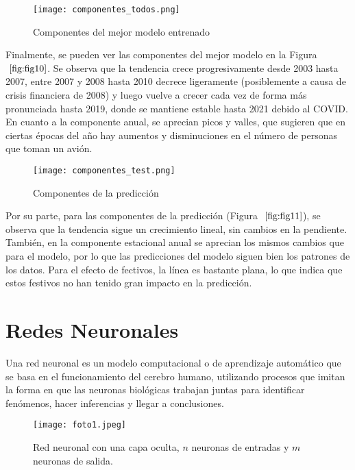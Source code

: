 \documentclass[12pt,twoside]{article}
\begin{document}
\begin{figure}[h]
    \centering
    \texttt{[image: componentes\_todos.png]}
    \caption{Componentes del mejor modelo entrenado }
    \label{fig:fig10}
\end{figure}

Finalmente, se pueden ver las componentes del mejor modelo en la Figura $~\ref{fig:fig10}$. Se observa que la tendencia crece progresivamente desde 2003 hasta 2007, entre 2007 y 2008 hasta 2010 decrece ligeramente (posiblemente a causa de crisis financiera de 2008) y luego vuelve a crecer cada vez de forma más pronunciada hasta 2019, donde se mantiene estable hasta 2021 debido al COVID. En cuanto a la componente anual, se aprecian picos y valles, que sugieren que en ciertas épocas del año hay aumentos y disminuciones en el número de personas que toman un avión.

\begin{figure}[h]
    \centering
    \texttt{[image: componentes\_test.png]}
    \caption{Componentes de la predicción} 
    \label{fig:fig11}
\end{figure}


Por su parte, para las componentes de la predicción (Figura $~\ref{fig:fig11}$), se observa que la tendencia sigue un crecimiento lineal, sin cambios en la pendiente. También, en la componente estacional anual se aprecian los mismos cambios que para el modelo, por lo que las predicciones del modelo siguen bien los patrones de los datos. Para el efecto de fectivos, la línea es bastante plana, lo que indica que estos festivos no han tenido gran impacto en la predicción.










\newpage


\section{Redes Neuronales}\label{sec:10}

Una red neuronal \cite{redes1} es un modelo computacional o de aprendizaje automático que se basa en el funcionamiento del cerebro humano, utilizando procesos que imitan la forma en que las neuronas biológicas trabajan juntas para identificar fenómenos, hacer inferencias y llegar a conclusiones.

\begin{figure}[h]
    \centering
    \texttt{[image: foto1.jpeg]}
    \caption{Red neuronal con una capa oculta, $n$ neuronas de entradas y $m$ neuronas de salida.} 
    \label{fig:fig12}
\end{figure}
\end{document}
